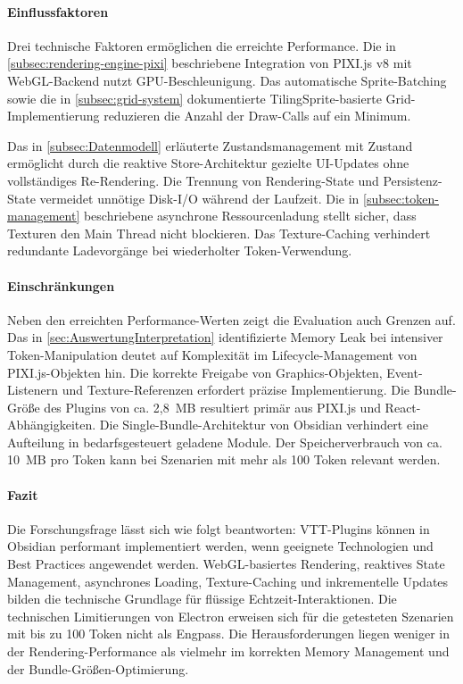 \paragraph{Einflussfaktoren}

Drei technische Faktoren ermöglichen die erreichte Performance. Die in \autoref{subsec:rendering-engine-pixi} beschriebene Integration von PIXI.js v8 mit \ac{WebGL}-Backend nutzt \ac{GPU}-Beschleunigung. Das automatische Sprite-Batching \autocite{PixiPerf2024} sowie die in \autoref{subsec:grid-system} dokumentierte TilingSprite-basierte Grid-Implementierung reduzieren die Anzahl der Draw-Calls auf ein Minimum.

Das in \autoref{subsec:Datenmodell} erläuterte Zustandsmanagement mit Zustand ermöglicht durch die reaktive Store-Architektur gezielte \ac{UI}-Updates ohne vollständiges Re-Rendering. Die Trennung von Rendering-State und Persistenz-State vermeidet unnötige Disk-\ac{I/O} während der Laufzeit. Die in \autoref{subsec:token-management} beschriebene asynchrone Ressourcenladung stellt sicher, dass Texturen den Main Thread nicht blockieren. Das Texture-Caching verhindert redundante Ladevorgänge bei wiederholter Token-Verwendung.

\paragraph{Einschränkungen}

Neben den erreichten Performance-Werten zeigt die Evaluation auch Grenzen auf. Das in \autoref{sec:AuswertungInterpretation} identifizierte Memory Leak bei intensiver Token-Manipulation deutet auf Komplexität im Lifecycle-Management von PIXI.js-Objekten hin. Die korrekte Freigabe von Graphics-Objekten, Event-Listenern und Texture-Referenzen erfordert präzise Implementierung. Die Bundle-Größe des Plugins von ca. 2,8~\ac{MB} resultiert primär aus PIXI.js und React-Abhängigkeiten. Die Single-Bundle-Architektur von Obsidian verhindert eine Aufteilung in bedarfsgesteuert geladene Module. Der Speicherverbrauch von ca. 10~\ac{MB} pro Token kann bei Szenarien mit mehr als 100 Token relevant werden.

\paragraph{Fazit}

Die Forschungsfrage lässt sich wie folgt beantworten: \ac{VTT}-Plugins können in Obsidian performant implementiert werden, wenn geeignete Technologien und Best Practices angewendet werden. \ac{WebGL}-basiertes Rendering, reaktives State Management, asynchrones Loading, Texture-Caching und inkrementelle Updates bilden die technische Grundlage für flüssige Echtzeit-Interaktionen. Die technischen Limitierungen von Electron erweisen sich für die getesteten Szenarien mit bis zu 100 Token nicht als Engpass. Die Herausforderungen liegen weniger in der Rendering-Performance als vielmehr im korrekten Memory Management und der Bundle-Größen-Optimierung.

